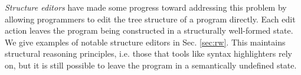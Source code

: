 

\emph{Structure editors} have made some progress toward addressing this
problem by allowing programmers to edit the tree structure of a program
directly. Each edit action leaves the program being constructed in a
structurally well-formed state. We give examples of notable structure editors in Sec. \ref{sec:rw}.  This maintains structural
reasoning principles, i.e. those that tools like syntax highlighters rely
on, but it is still possible to leave the program in a semantically undefined state.


